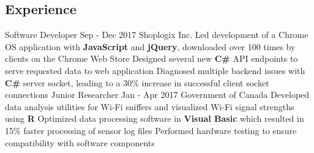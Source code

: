 \documentclass[]{aanguyen_res}
\begin{document}
	\begin{main}%
		\vspace{35pt}%
		\section{Experience}
			\mainentry%
				{Software Developer}%
				{Sep - Dec 2017}%
				{Shoplogix Inc.}%
				{\faCaretRight Led development of a Chrome OS application with \textbf{JavaScript} and \textbf{jQuery}, downloaded over 100 times by clients on the Chrome Web Store
				\faCaretRight Designed several new \textbf{C\#} API endpoints to serve requested data to web application
				\faCaretRight Diagnosed multiple backend issues with \textbf{C\#} server socket, leading to a 30\% increase in successful client socket connections}
			\vspace{0.1cm}%
			\mainentry%
				{Junior Researcher}%
				{Jan - Apr 2017}%
				{Government of Canada}%
				{\faCaretRight Developed data analysis utilities for Wi-Fi sniffers and visualized Wi-Fi signal strengths using \textbf{R}
				  \faCaretRight Optimized data processing software in \textbf{Visual Basic} which resulted in 15\% faster processing of sensor log files
				  \faCaretRight Performed hardware testing to ensure compatibility with software components}
			\vspace{0.30cm}%

\end{main}
\end{document}
